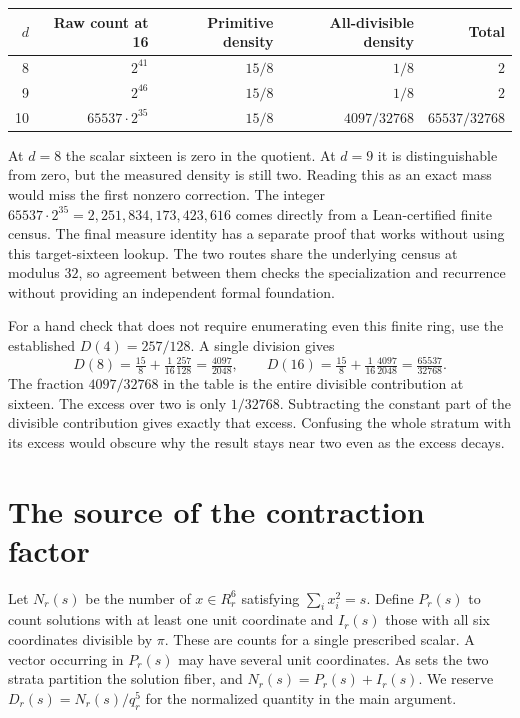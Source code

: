 \documentclass[12pt,letterpaper]{article}
\begin{document}
\begin{center}\small\begin{tabular}{rrrrr}\toprule
$d$ & Raw count at 16 & Primitive density & All-divisible density & Total\\\midrule
8 & $2^{41}$ & $15/8$ & $1/8$ & $2$\\
9 & $2^{46}$ & $15/8$ & $1/8$ & $2$\\
10 & $65537\cdot2^{35}$ & $15/8$ & $4097/32768$ & $65537/32768$\\\bottomrule
\end{tabular}\end{center}
At $d=8$ the scalar sixteen is zero in the quotient. At $d=9$ it is distinguishable from zero, but the measured density is still two. Reading this as an exact mass would miss the first nonzero correction. The integer $65537\cdot2^{35}=2{,}251{,}834{,}173{,}423{,}616$ comes directly from a Lean-certified finite census. The final measure identity has a separate proof that works without using this target-sixteen lookup. The two routes share the underlying census at modulus $32$, so agreement between them checks the specialization and recurrence without providing an independent formal foundation.

For a hand check that does not require enumerating even this finite ring, use the established $D(4)=257/128$. A single division gives
\[
 D(8)=\tfrac{15}{8}+\tfrac1{16}\tfrac{257}{128}
      =\tfrac{4097}{2048},\qquad
 D(16)=\tfrac{15}{8}+\tfrac1{16}\tfrac{4097}{2048}
      =\tfrac{65537}{32768}.
\]
The fraction $4097/32768$ in the table is the entire divisible contribution at sixteen. The excess over two is only $1/32768$. Subtracting the constant part of the divisible contribution gives exactly that excess. Confusing the whole stratum with its excess would obscure why the result stays near two even as the excess decays.

\section{The source of the contraction factor}
Let $N_r(s)$ be the number of $x\in R_r^6$ satisfying $\sum_i x_i^2=s$. Define $P_r(s)$ to count solutions with at least one unit coordinate and $I_r(s)$ those with all six coordinates divisible by $\pi$. These are counts for a single prescribed scalar. A vector occurring in $P_r(s)$ may have several unit coordinates. As sets the two strata partition the solution fiber, and $N_r(s)=P_r(s)+I_r(s)$. We reserve $D_r(s)=N_r(s)/q_r^5$ for the normalized quantity in the main argument.
\end{document}
